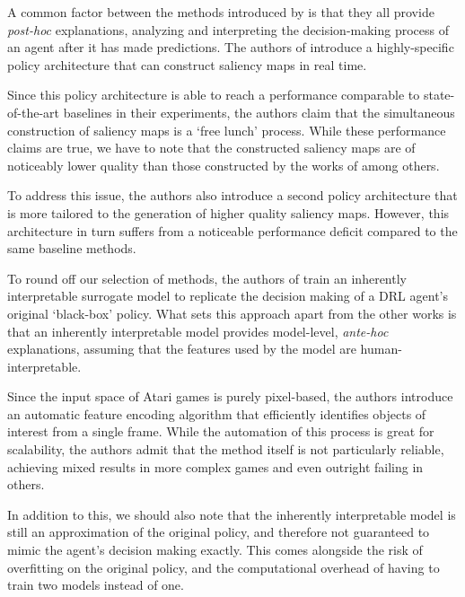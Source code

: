 \documentclass[sigconf]{acmart}
\begin{document}
A common factor between the methods introduced by \cite{Zahavy2016,Greydanus2018,Huber2019} is that they all provide \textit{post-hoc} explanations, analyzing and interpreting the decision-making process of an agent after it has made predictions\cite{RETZLAFF2024101243}.
The authors of \cite{Nikulin2019} introduce a highly-specific policy architecture that can construct saliency maps in real time.

Since this policy architecture is able to reach a performance comparable to state-of-the-art baselines in their experiments, the authors claim that the simultaneous construction of saliency maps is a `free lunch' process.
While these performance claims are true, we have to note that the constructed saliency maps are of noticeably lower quality than those constructed by the works of \cite{Greydanus2018,Huber2019} among others.

To address this issue, the authors also introduce a second policy architecture that is more tailored to the generation of higher quality saliency maps.
However, this architecture in turn suffers from a noticeable performance deficit compared to the same baseline methods.

To round off our selection of methods, the authors of \cite{Sieusahai2021} train an inherently interpretable surrogate model to replicate the decision making of a DRL agent's original `black-box' policy.
What sets this approach apart from the other works is that an inherently interpretable model provides model-level, \textit{ante-hoc} explanations, assuming that the features used by the model are human-interpretable\cite{RETZLAFF2024101243}.

Since the input space of Atari games is purely pixel-based, the authors introduce an automatic feature encoding algorithm that efficiently identifies objects of interest from a single frame.
While the automation of this process is great for scalability, the authors admit that the method itself is not particularly reliable, achieving mixed results in more complex games and even outright failing in others.

In addition to this, we should also note that the inherently interpretable model is still an approximation of the original policy, and therefore not guaranteed to mimic the agent's decision making exactly.
This comes alongside the risk of overfitting on the original policy, and the computational overhead of having to train two models instead of one.

\end{document}
